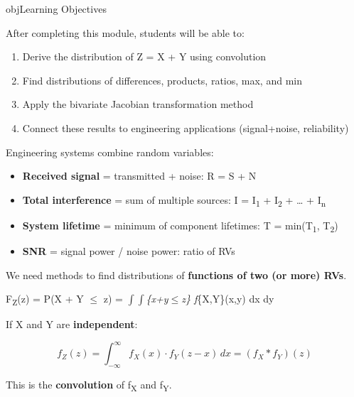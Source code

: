 \begin{PSbox}[unbreakable]{obj}{Learning Objectives}

After completing this module, students will be able to:

\begin{enumerate}
\def\labelenumi{\arabic{enumi}.}
\tightlist
\item
  Derive the distribution of Z = X + Y using convolution
\item
  Find distributions of differences, products, ratios, max, and min
\item
  Apply the bivariate Jacobian transformation method
\item
  Connect these results to engineering applications (signal+noise, reliability)
\end{enumerate}

\end{PSbox}


Engineering systems combine random variables:

\begin{itemize}
\tightlist
\item
  \textbf{Received signal} = transmitted + noise: R = S + N
\item
  \textbf{Total interference} = sum of multiple sources: I = I\textsubscript{1} + I\textsubscript{2} + … + I\textsubscript{n}
\item
  \textbf{System lifetime} = minimum of component lifetimes: T = min(T\textsubscript{1}, T\textsubscript{2})
\item
  \textbf{SNR} = signal power / noise power: ratio of RVs
\end{itemize}

We need methods to find distributions of \textbf{functions of two (or more) RVs}.



F\textsubscript{Z}(z) = P(X + Y \ensuremath{\le} z) = \ensuremath{\int}\ensuremath{\int}\emph{\{x+y\ensuremath{\le}z\} f}\{X,Y\}(x,y) dx dy


If X and Y are \textbf{independent}:

\[f_Z(z) = \int_{-\infty}^{\infty} f_X(x) \cdot f_Y(z-x) \, dx = (f_X * f_Y)(z)\]

This is the \textbf{convolution} of f\textsubscript{X} and f\textsubscript{Y}.

